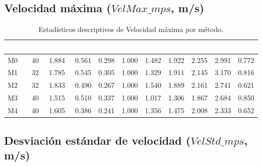 \documentclass[12pt,a4paper,oneside]{book}
\begin{document}
\subsection{Velocidad máxima ($\textit{VelMax\_mps}$, m/s)}

\begin{table}[H]
\centering
\caption{Estadísticos descriptivos de Velocidad máxima por método.}
\renewcommand{\arraystretch}{1.25}
\small
\begin{tabular}{lcccccccccc}
\toprule
\rowcolor{primary}
\textcolor{white}{\textbf{Mét.}} & \textcolor{white}{\textbf{n}} & \textcolor{white}{\textbf{Media}} & \textcolor{white}{\textbf{SD}} & \textcolor{white}{\textbf{CV}} & \textcolor{white}{\textbf{Mín}} & \textcolor{white}{\textbf{Q25}} & \textcolor{white}{\textbf{Med}} & \textcolor{white}{\textbf{Q75}} & \textcolor{white}{\textbf{Máx}} & \textcolor{white}{\textbf{IQR}} \\
\midrule
M0 & 40 & 1.884 & 0.561 & 0.298 & 1.000 & 1.482 & 1.922 & 2.255 & 2.991 & 0.772 \\
M1 & 32 & 1.785 & 0.545 & 0.305 & 1.000 & 1.329 & 1.911 & 2.145 & 3.170 & 0.816 \\
M2 & 32 & 1.833 & 0.490 & 0.267 & 1.000 & 1.540 & 1.889 & 2.161 & 2.741 & 0.621 \\
M3 & 40 & 1.515 & 0.510 & 0.337 & 1.000 & 1.017 & 1.306 & 1.867 & 2.684 & 0.850 \\
M4 & 40 & 1.605 & 0.386 & 0.241 & 1.000 & 1.356 & 1.475 & 2.008 & 2.333 & 0.652 \\
\bottomrule
\end{tabular}
\end{table}

\subsection{Desviación estándar de velocidad ($\textit{VelStd\_mps}$, m/s)}
\end{document}

